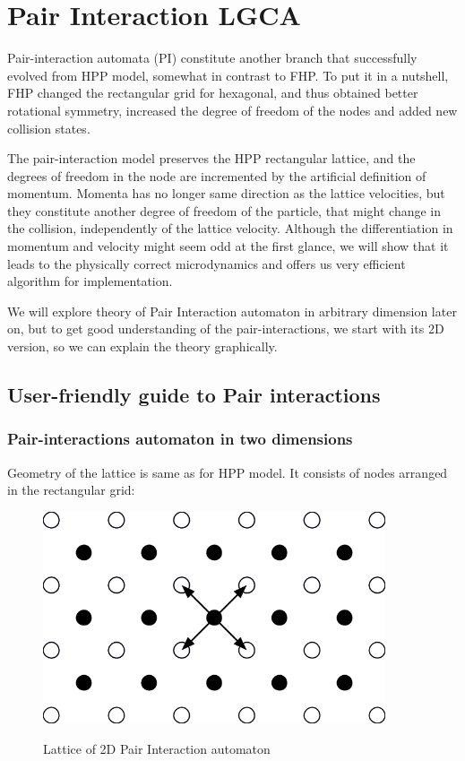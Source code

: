 \chapter{Pair Interaction LGCA}
Pair-interaction automata (PI) constitute another branch that successfully evolved from HPP model, somewhat in contrast to FHP.
To put it in a nutshell, FHP changed the rectangular grid for hexagonal, and thus obtained better rotational symmetry, increased the degree of freedom of the nodes and added new collision states. 

The pair-interaction model preserves the HPP rectangular lattice, and the degrees of freedom in the node are incremented by the artificial definition of momentum.
Momenta has no longer same direction as the lattice velocities, but they constitute another degree of freedom of the particle, that might change in the collision, independently of the lattice velocity. 
Although the differentiation in momentum and velocity might seem odd at the first glance, we will show that it leads to the physically correct microdynamics and offers us very efficient algorithm for implementation.

\bigskip
We will explore theory of Pair Interaction automaton in arbitrary dimension later on, but to get good understanding of the pair-interactions, we start with its $2$D version, so we can explain the theory graphically.

\section{User-friendly guide to Pair interactions}

\subsection{Pair-interactions automaton in two dimensions}

Geometry of the lattice is same as for HPP model. It consists of nodes arranged in the rectangular grid:

\begin{figure}[htbp]
 \centering 
 \includegraphics[width=0.9\textwidth]{./img/pi_grid}
 \label{2dgrid}
 \caption{Lattice of 2D Pair Interaction automaton}
\end{figure}

